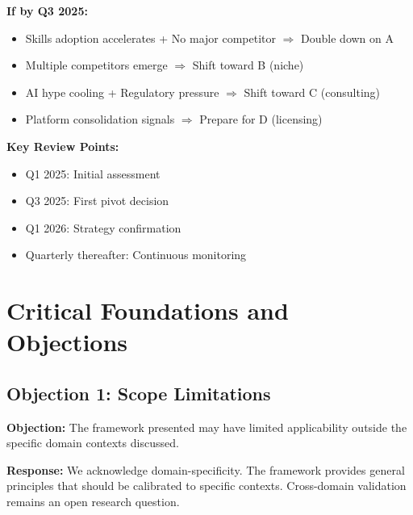 \begin{tcolorbox}[colback=yellow!5!white, colframe=yellow!75!black,
    title=Decision Tree: When to Pivot]

\textbf{If by Q3 2025:}
\begin{itemize}[nosep]
\item Skills adoption accelerates + No major competitor $\Rightarrow$ Double down on A
\item Multiple competitors emerge $\Rightarrow$ Shift toward B (niche)
\item AI hype cooling + Regulatory pressure $\Rightarrow$ Shift toward C (consulting)
\item Platform consolidation signals $\Rightarrow$ Prepare for D (licensing)
\end{itemize}

\textbf{Key Review Points:}
\begin{itemize}[nosep]
\item Q1 2025: Initial assessment
\item Q3 2025: First pivot decision
\item Q1 2026: Strategy confirmation
\item Quarterly thereafter: Continuous monitoring
\end{itemize}

\end{tcolorbox}



\section{Critical Foundations and Objections}
\label{sec:vvv3-foundations}

\subsection{Objection 1: Scope Limitations}

\textbf{Objection:} The framework presented may have limited applicability
outside the specific domain contexts discussed.

\textbf{Response:} We acknowledge domain-specificity. The framework provides
general principles that should be calibrated to specific contexts. Cross-domain
validation remains an open research question.

